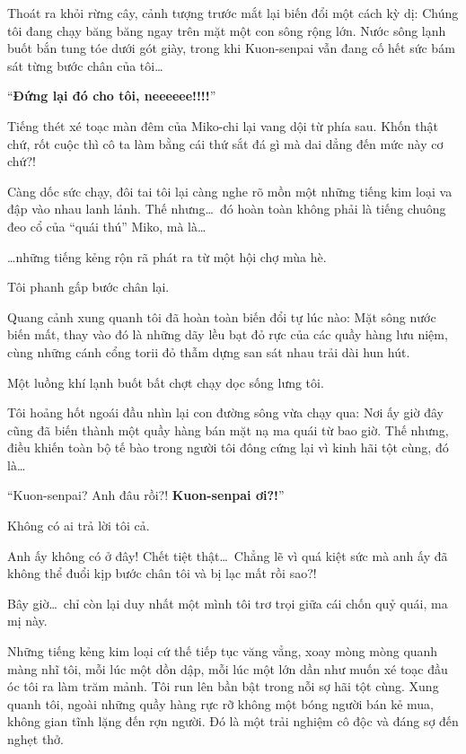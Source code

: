 \documentclass[../main.tex]{subfiles}
\begin{document}
Thoát ra khỏi rừng cây, cảnh tượng trước mắt lại biến đổi một cách kỳ dị: Chúng tôi đang chạy băng băng ngay trên mặt một con sông rộng lớn. Nước sông lạnh buốt bắn tung tóe dưới gót giày, trong khi Kuon-senpai vẫn đang cố hết sức bám sát từng bước chân của tôi\dots


``\textbf{Đứng lại đó cho tôi, neeeeee!!!!}''

Tiếng thét xé toạc màn đêm của Miko-chi lại vang dội từ phía sau. Khốn thật chứ, rốt cuộc thì cô ta làm bằng cái thứ sắt đá gì mà dai dẳng đến mức này cơ chứ?!

Càng dốc sức chạy, đôi tai tôi lại càng nghe rõ mồn một những tiếng kim loại va đập vào nhau lanh lảnh. Thế nhưng\dots\ đó hoàn toàn không phải là tiếng chuông đeo cổ của ``quái thú'' Miko, mà là\dots

\dots những tiếng kẻng rộn rã phát ra từ một hội chợ mùa hè.

Tôi phanh gấp bước chân lại.

Quang cảnh xung quanh tôi đã hoàn toàn biến đổi tự lúc nào: Mặt sông nước biến mất, thay vào đó là những dãy lều bạt đỏ rực của các quầy hàng lưu niệm, cùng những cánh cổng torii đỏ thẫm dựng san sát nhau trải dài hun hút.


Một luồng khí lạnh buốt bất chợt chạy dọc sống lưng tôi.

Tôi hoảng hốt ngoái đầu nhìn lại con đường sông vừa chạy qua: Nơi ấy giờ đây cũng đã biến thành một quầy hàng bán mặt nạ ma quái từ bao giờ. Thế nhưng, điều khiến toàn bộ tế bào trong người tôi đông cứng lại vì kinh hãi tột cùng, đó là\dots

``Kuon-senpai? Anh đâu rồi?! \textbf{Kuon-senpai ơi?!}''

Không có ai trả lời tôi cả.

Anh ấy không có ở đây! Chết tiệt thật\dots\ Chẳng lẽ vì quá kiệt sức mà anh ấy đã không thể đuổi kịp bước chân tôi và bị lạc mất rồi sao?!

Bây giờ\dots\ chỉ còn lại duy nhất một mình tôi trơ trọi giữa cái chốn quỷ quái, ma mị này.

Những tiếng kẻng kim loại cứ thế tiếp tục văng vẳng, xoay mòng mòng quanh màng nhĩ tôi, mỗi lúc một dồn dập, mỗi lúc một lớn dần như muốn xé toạc đầu óc tôi ra làm trăm mảnh. Tôi run lên bần bật trong nỗi sợ hãi tột cùng. Xung quanh tôi, ngoài những quầy hàng rực rỡ không một bóng người bán kẻ mua, không gian tĩnh lặng đến rợn người. Đó là một trải nghiệm cô độc và đáng sợ đến nghẹt thở.
\end{document}
